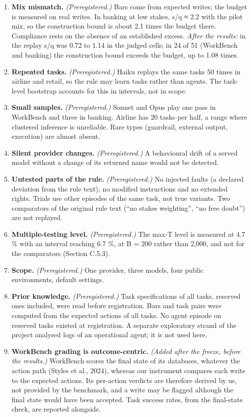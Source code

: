 \begin{enumerate}
\item
  \textbf{Mix mismatch.} \emph{(Preregistered.)} Bars come from expected writes; the budget is measured on real writes. In banking at low stakes, s/q ≈ 2.2 with the pilot mix, so the construction bound is about 2.1 times the budget there. Compliance rests on the absence of an established excess. \emph{After the results:} in the replay s/q was 0.72 to 1.14 in the judged cells; in 24 of 51 (WorkBench and banking) the construction bound exceeds the budget, up to 1.08 times.
\item
  \textbf{Repeated tasks.} \emph{(Preregistered.)} Haiku replays the same tasks 50 times in airline and retail, so the rule may learn tasks rather than agents. The task-level bootstrap accounts for this in intervals, not in scope.
\item
  \textbf{Small samples.} \emph{(Preregistered.)} Sonnet and Opus play one pass in WorkBench and three in banking. Airline has 20 tasks per half, a range where clustered inference is unreliable. Rare types (guardrail, external output, execution) are almost absent.
\item
  \textbf{Silent provider changes.} \emph{(Preregistered.)} A behavioural drift of a served model without a change of its returned name would not be detected.
\item
  \textbf{Untested parts of the rule.} \emph{(Preregistered.)} No injected faults (a declared deviation from the rule text); no modified instructions and no extended rights. Trials use other episodes of the same task, not true variants. Two comparators of the original rule text (``no stakes weighting'', ``no free doubt'') are not replayed.
\item
  \textbf{Multiple-testing level.} \emph{(Preregistered.)} The max-T level is measured at 4.7 \% with an interval reaching 6.7 \%, at B = 200 rather than 2,000, and not for the comparators (Section C.5.3).
\item
  \textbf{Scope.} \emph{(Preregistered.)} One provider, three models, four public environments, default settings.
\item
  \textbf{Prior knowledge.} \emph{(Preregistered.)} Task specifications of all tasks, reserved ones included, were read before registration. Bars and task pairs were computed from the expected actions of all tasks. No agent episode on reserved tasks existed at registration. A separate exploratory strand of the project analysed logs of an operational agent; it is not used here.
\item
  \textbf{WorkBench grading is outcome-centric.} \emph{(Added after the freeze, before the results.)} WorkBench scores the final state of its databases, whatever the action path (Styles et al., 2024), whereas our instrument compares each write to the expected actions. Its per-action verdicts are therefore derived by us, not provided by the benchmark, and a write may be flagged although the final state would have been accepted. Task success rates, from the final-state check, are reported alongside.

\end{enumerate}
